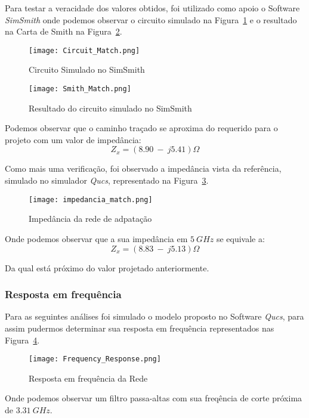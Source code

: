 \documentclass[a4paper,12pt]{proc}
\begin{document}
 Para testar a veracidade dos valores obtidos, foi utilizado como apoio o Software \textit{SimSmith} onde podemos observar o circuito simulado na Figura~\ref{MatchSim} e o resultado na Carta de Smith na Figura~\ref{smith}.

\begin{figure}[htbp]
    \centering
    \texttt{[image: Circuit\_Match.png]}
    \caption{Circuito Simulado no SimSmith}
    \label{MatchSim}
\end{figure}

\begin{figure}[htbp]
    \centering
    \texttt{[image: Smith\_Match.png]}
    \caption{Resultado do circuito simulado no SimSmith}
    \label{smith}
\end{figure}

\noindent Podemos observar que o caminho traçado se aproxima do requerido para o projeto com um valor de impedância:
\[Z_{x} =  (8.90~-~j5.41)\Omega \]

\noindent Como mais uma verificação, foi observado a impedância vista da referência, simulado no simulador \textit{Qucs}, representado na Figura~\ref{z}.

\begin{figure}[htbp]
    \centering
    \texttt{[image: impedancia\_match.png]}
    \caption{Impedância da rede de adpatação}
    \label{z}
\end{figure}

\noindent Onde podemos observar que a sua impedância em $5~GHz$ se equivale a:
\[Z_{x} =  (8.83~-~j5.13)\Omega \]

\noindent Da qual está próximo do valor projetado anteriormente.

\subsubsection{Resposta em frequência}  

Para as seguintes análises foi simulado o modelo proposto no Software \textit{Qucs}, para assim pudermos determinar sua resposta em frequência representados nas Figura~\ref{freq}.

\begin{figure}[htbp]
    \centering
    \texttt{[image: Frequency\_Response.png]}
    \caption{Resposta em frequência da Rede}
    \label{freq}
\end{figure}

\noindent Onde podemos observar um filtro passa-altas com sua freqência de corte próxima de $3.31~GHz$.
\end{document}
